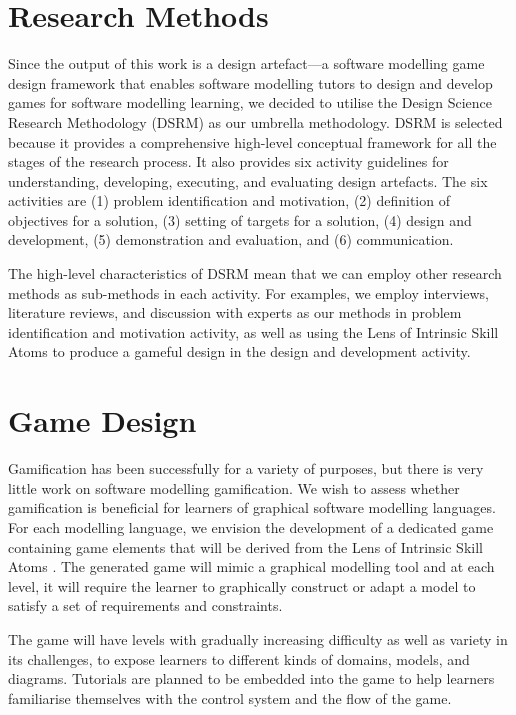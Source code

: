\documentclass[runningheads,a4paper]{llncs}
\begin{document}
\section{Research Methods}
Since the output of this work is a design artefact---a software modelling game design framework that enables software modelling tutors to design and develop games for software modelling learning, we decided to utilise the Design Science Research Methodology (DSRM) \cite{peffers2007design} as our umbrella methodology. DSRM is selected because it provides a comprehensive high-level conceptual framework for all the stages of the research process. It also provides six activity guidelines for understanding, developing, executing, and evaluating design artefacts. The six activities are (1) problem identification and motivation, (2) definition of objectives for a solution, (3) setting of targets for a solution, (4) design and development, (5) demonstration and evaluation, and (6) communication. 

The high-level characteristics of DSRM mean that we can employ other research methods as sub-methods in each activity. For examples, we employ interviews, literature reviews, and discussion with experts as our methods in problem identification and motivation activity, as well as using the Lens of Intrinsic Skill Atoms \cite{deterding2015lens} to produce a gameful design in the design and development activity.

\section{Game Design}
Gamification has been successfully for a variety of purposes, but there is very little work on software modelling gamification. We wish to assess whether gamification is beneficial for learners of graphical software modelling languages. For each modelling language, we envision the development of a dedicated game containing game elements that will be derived from the Lens of Intrinsic Skill Atoms \cite{deterding2015lens}. The generated game will mimic a graphical modelling tool and at each level, it will require the learner to graphically construct or adapt a model to satisfy a set of requirements and constraints.
	
The game will have levels with gradually increasing difficulty as well as variety in its challenges, to expose learners to different kinds of domains, models, and diagrams. Tutorials are planned to be embedded into the game to help learners familiarise themselves with the control system and the flow of the game. 
\end{document}
